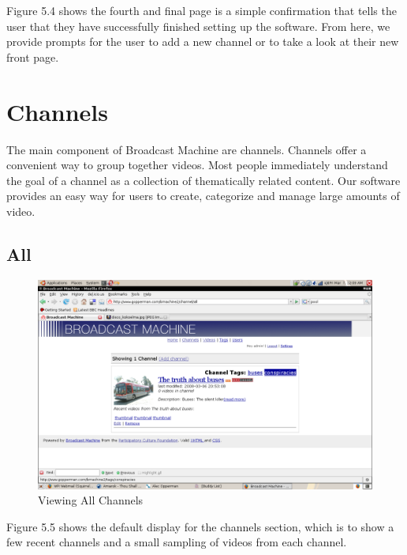 \documentclass[a4paper,12pt]{report}
\begin{document}
Figure 5.4 shows the fourth and final page is a simple confirmation that tells the user that they have successfully finished setting up the software.
From here, we provide prompts for the user to add a new channel or to take a look at their new front page.

\section{Channels}
The main component of Broadcast Machine are channels.
Channels offer a convenient way to group together videos.
Most people immediately understand the goal of a channel as a collection of thematically related content.
Our software provides an easy way for users to create, categorize and manage large amounts of video.

\subsection{All}
\begin{figure}[htp]
\begin{center}
\includegraphics[width=150mm]{./images/channelall.png}
\end{center}
\caption{Viewing All Channels}
\end{figure}

Figure 5.5 shows the default display for the channels section, which is to show a few recent channels and a small sampling of videos from each channel.
\end{document}
